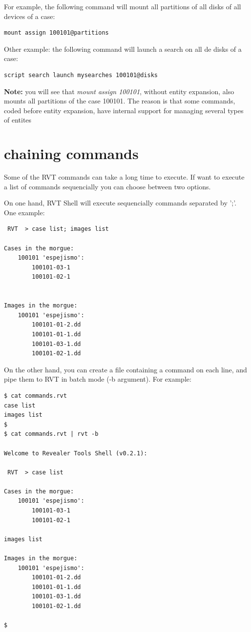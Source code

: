 \documentclass[a4paper,11pt,oneside]{report}
\begin{document}
For example, the following command will mount all partitions of all disks of all devices of a case:

\begin{verbatim}
mount assign 100101@partitions
\end{verbatim}

Other example: the following command will launch a search on all de disks of a case:

\begin{verbatim}
script search launch mysearches 100101@disks
\end{verbatim}


\textbf{Note:} you will see that \emph{mount assign 100101}, without entity expansion, also mounts all partitions of the case 100101. The reason is that some commands, coded before entity expansion, have internal support for managing several types of entites


\section{chaining commands}

Some of the RVT commands can take a long time to execute. If want to execute a list of commands sequencially you can choose between two options.

On one hand, RVT Shell will execute sequencially commands separated by ';'. One example:

\begin{verbatim}
 RVT  > case list; images list

Cases in the morgue: 
	100101 'espejismo':
		100101-03-1
		100101-02-1


Images in the morgue: 
	100101 'espejismo':
		100101-01-2.dd
		100101-01-1.dd
		100101-03-1.dd
		100101-02-1.dd
\end{verbatim}

On the other hand, you can create a file containing a command on each line, and pipe them to RVT in batch mode (-b argument). For example:

\begin{verbatim}
$ cat commands.rvt 
case list
images list
$
$ cat commands.rvt | rvt -b

Welcome to Revealer Tools Shell (v0.2.1):

 RVT  > case list

Cases in the morgue: 
	100101 'espejismo':
		100101-03-1
		100101-02-1

images list

Images in the morgue: 
	100101 'espejismo':
		100101-01-2.dd
		100101-01-1.dd
		100101-03-1.dd
		100101-02-1.dd

$
\end{verbatim}
\end{document}
